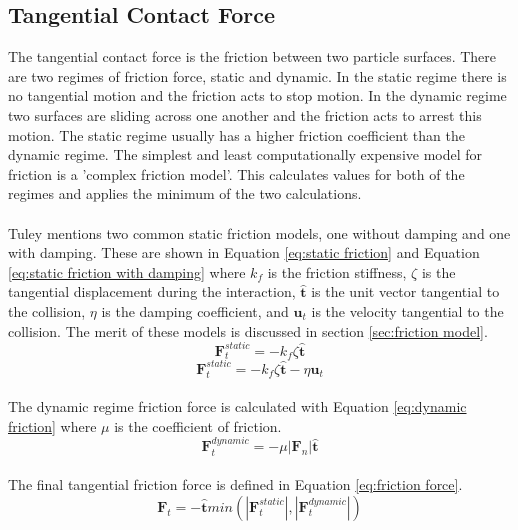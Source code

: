 \documentclass[a4paper,11pt,titlepage]{report}
\begin{document}
\subsection{Tangential Contact Force}
\label{sec:tangential contact force}
The tangential contact force is the friction between two particle surfaces. There are two regimes of friction force, static and dynamic. In the static regime there is no tangential motion and the friction acts to stop motion. In the dynamic regime two surfaces are sliding across one another and the friction acts to arrest this motion. The static regime usually has a higher friction coefficient than the dynamic regime. The simplest and least computationally expensive model for friction is a 'complex friction model'. This calculates values for both of the regimes and applies the minimum of the two calculations.\cite{tuley}
\\\\Tuley\cite{tuley} mentions two common static friction models, one without damping and one with damping. These are shown in Equation \ref{eq:static friction} and Equation \ref{eq:static friction with damping} where $k_f$ is the friction stiffness, $\zeta$ is the tangential displacement during the interaction, $\mathbf{\hat{t}}$ is the unit vector tangential to the collision, $\eta$ is the damping coefficient, and $\mathbf{u}_t$ is the velocity tangential to the collision. The merit of these models is discussed in section \ref{sec:friction model}.
\begin{equation}
\mathbf{F}_{t}^{static} = - k_{f} \zeta \mathbf{\hat{t}}
\label{eq:static friction}
\end{equation}
\begin{equation}
\mathbf{F}_{t}^{static} = - k_{f} \zeta \mathbf{\hat{t}} - \eta \mathbf{u}_t
\label{eq:static friction with damping}
\end{equation}
\\The dynamic regime friction force is calculated with Equation \ref{eq:dynamic friction} where $\mu$ is the coefficient of friction.
\begin{equation}
\mathbf{F}_{t}^{dynamic} = - \mu |\mathbf{F}_{n}| \mathbf{\hat{t}}
\label{eq:dynamic friction}
\end{equation}
\\The final tangential friction force is defined in Equation \ref{eq:friction force}.
\begin{equation}
\mathbf{F}_{t} = -\mathbf{\hat{t}}min(|\mathbf{F}_{t}^{static}|, |\mathbf{F}_{t}^{dynamic}|)
\label{eq:friction force}
\end{equation}
\end{document}
